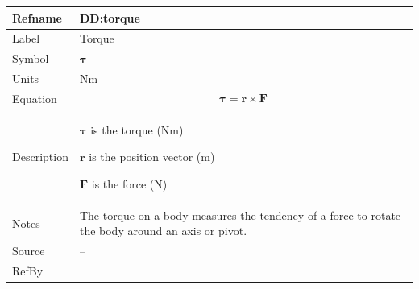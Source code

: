 \documentclass[12pt]{article}
\begin{document}
\medskip
\noindent
\begin{minipage}{\textwidth}
\begin{tabular}{>{\raggedright}p{}>{\raggedright\arraybackslash}p{}}
\toprule \textbf{Refname} & \textbf{DD:torque}
\label{DD:torque}
\\ \midrule
Label & Torque
        
\\ \midrule
Symbol & $\symbf{τ}$
         
\\ \midrule
Units & $\text{N}\text{m}$
        
\\ \midrule
Equation & \begin{displaymath}
           \symbf{τ}=\symbf{r}\times\symbf{F}
           \end{displaymath}
\\ \midrule
Description & \begin{symbDescription}
              \item{$\symbf{τ}$ is the torque ($\text{N}\text{m}$)}
              \item{$\symbf{r}$ is the position vector (${\text{m}}$)}
              \item{$\symbf{F}$ is the force (${\text{N}}$)}
              \end{symbDescription}
\\ \midrule
Notes & The torque on a body measures the tendency of a force to rotate the body around an axis or pivot.
        
\\ \midrule
Source & --
         
\\ \midrule
RefBy & 
\\ \bottomrule
\end{tabular}
\end{minipage}
\end{document}
